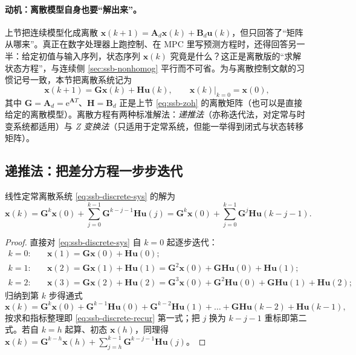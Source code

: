 \paragraph{动机：离散模型自身也要“解出来”。}
上节把连续模型化成离散 $\mathbf{x}(k{+}1)=\mathbf{A}_d\mathbf{x}(k)+\mathbf{B}_d\mathbf{u}(k)$，但只回答了“矩阵从哪来”。真正在数字处理器上跑控制、在 MPC 里写预测方程时，还得回答另一半：给定初值与输入序列，状态序列 $\mathbf{x}(k)$ 究竟是什么？这正是离散版的“求解状态方程”，与连续侧 \cref{sec:ssb-nonhomog} 平行而不可省。为与离散控制文献的习惯记号一致，本节把离散系统记为
\begin{equation}
  \mathbf{x}(k{+}1)=\mathbf{G}\mathbf{x}(k)+\mathbf{H}\mathbf{u}(k),\qquad \mathbf{x}(k)\big|_{k=0}=\mathbf{x}(0),
  \label{eq:ssb-discrete-sys}
\end{equation}
其中 $\mathbf{G}=\mathbf{A}_d=\mathrm{e}^{\mathbf{A}T}$、$\mathbf{H}=\mathbf{B}_d$ 正是上节 \cref{eq:ssb-zoh} 的离散矩阵（也可以是直接给定的离散模型）。离散方程有两种标准解法\cite{liubao2006modern}：\emph{递推法}（亦称迭代法，对定常与时变系统都适用）与 \emph{Z 变换法}（只适用于定常系统，但能一举得到闭式与状态转移矩阵）。

\subsection{递推法：把差分方程一步步迭代}
\label{sec:ssb-discrete-recur}

\begin{theorem}[离散状态方程的递推解]\label{thm:ssb-discrete-recur}
线性定常离散系统 \cref{eq:ssb-discrete-sys} 的解为
\begin{equation}
  \mathbf{x}(k)=\mathbf{G}^k\mathbf{x}(0)+\sum_{j=0}^{k-1}\mathbf{G}^{k-j-1}\mathbf{H}\mathbf{u}(j)
  =\mathbf{G}^k\mathbf{x}(0)+\sum_{j=0}^{k-1}\mathbf{G}^{j}\mathbf{H}\mathbf{u}(k-j-1).
  \label{eq:ssb-discrete-recur}
\end{equation}
\end{theorem}
\begin{proof}
直接对 \cref{eq:ssb-discrete-sys} 自 $k=0$ 起逐步迭代：
\begin{align*}
  k=0:&\quad \mathbf{x}(1)=\mathbf{G}\mathbf{x}(0)+\mathbf{H}\mathbf{u}(0);\\
  k=1:&\quad \mathbf{x}(2)=\mathbf{G}\mathbf{x}(1)+\mathbf{H}\mathbf{u}(1)=\mathbf{G}^2\mathbf{x}(0)+\mathbf{G}\mathbf{H}\mathbf{u}(0)+\mathbf{H}\mathbf{u}(1);\\
  k=2:&\quad \mathbf{x}(3)=\mathbf{G}\mathbf{x}(2)+\mathbf{H}\mathbf{u}(2)=\mathbf{G}^3\mathbf{x}(0)+\mathbf{G}^2\mathbf{H}\mathbf{u}(0)+\mathbf{G}\mathbf{H}\mathbf{u}(1)+\mathbf{H}\mathbf{u}(2);
\end{align*}
归纳到第 $k$ 步得通式
\[
  \mathbf{x}(k)=\mathbf{G}^k\mathbf{x}(0)+\mathbf{G}^{k-1}\mathbf{H}\mathbf{u}(0)+\mathbf{G}^{k-2}\mathbf{H}\mathbf{u}(1)+\dots+\mathbf{G}\mathbf{H}\mathbf{u}(k-2)+\mathbf{H}\mathbf{u}(k-1),
\]
按求和指标整理即 \cref{eq:ssb-discrete-recur} 第一式；把 $j$ 换为 $k-j-1$ 重标即第二式。若自 $k=h$ 起算、初态 $\mathbf{x}(h)$，同理得 $\mathbf{x}(k)=\mathbf{G}^{k-h}\mathbf{x}(h)+\sum_{j=h}^{k-1}\mathbf{G}^{k-j-1}\mathbf{H}\mathbf{u}(j)$。
\end{proof}


